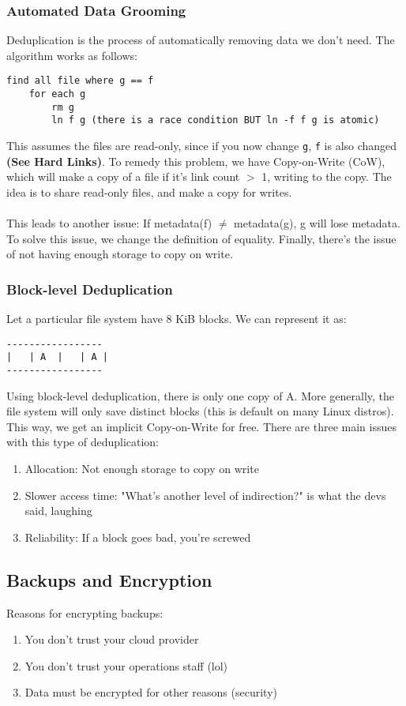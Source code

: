 \documentclass[13pt]{article}
\begin{document}
\subsubsection{Automated Data Grooming}
Deduplication is the process of automatically removing data we don't need. The algorithm works as follows:
\begin{verbatim}
find all file where g == f
    for each g
        rm g
        ln f g (there is a race condition BUT ln -f f g is atomic)
\end{verbatim}
This assumes the files are read-only, since if you now change \texttt{g}, \texttt{f} is also changed \textbf{(See Hard Links)}. To remedy this problem, we have Copy-on-Write (CoW), which will make a copy of a file if it's link count $>$ 1, writing to the copy. The idea is to share read-only files, and make a copy for writes. \\ \\
This leads to another issue: If metadata(f) $\neq$ metadata(g), g will lose metadata. To solve this issue, we change the definition of equality. Finally, there's the issue of not having enough storage to copy on write.

\subsubsection*{Block-level Deduplication}
Let a particular file system have 8 KiB blocks. We can represent it as:
\begin{verbatim}
-----------------
|   | A  |   | A |
-----------------
\end{verbatim}
Using block-level deduplication, there is only one copy of A. More generally, the file system will only save distinct blocks (this is default on many Linux distros). This way, we get an implicit Copy-on-Write for free. There are three main issues with this type of deduplication:
\begin{enumerate}[label=(\arabic*)]
\item Allocation: Not enough storage to copy on write
\item Slower access time: "What's another level of indirection?" is what the devs said, laughing
\item Reliability: If a block goes bad, you're screwed
\end{enumerate}

\subsection{Backups and Encryption}
Reasons for encrypting backups:
\begin{enumerate}[label=(\arabic*)]
\item You don't trust your cloud provider
\item You don't trust your operations staff (lol)
\item Data must be encrypted for other reasons (security)
\end{enumerate}
\end{document}
